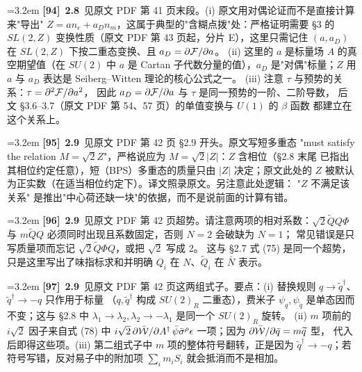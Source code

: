 \par
\par\medskip\noindent\hangindent=3.2em \textbf{[94]}~\textbf{2.8}~见原文 PDF 第 41 页末段。(i) 原文用对偶论证而不是直接计算来"导出" $Z=an_e+a_Dn_m$，这属于典型的"含糊点拨"处：严格证明需要 §3 的 $SL(2,Z)$ 变换性质（原文 PDF 第 43 页起，分片 E），这里只需记住 $(a,a_D)$ 在 $SL(2,Z)$ 下按二重态变换、且 $a_D=\partial{\cal F}/\partial a$。 (ii) 这里的 $a$ 是标量场 $A$ 的真空期望值（在 $SU(2)$ 中 $a$ 是 Cartan 子代数分量的值），$a_D$ 是"对偶"标量；$Z$ 用 $a$ 与 $a_D$ 表达是 Seiberg--Witten 理论的核心公式之一。 (iii) 注意 $\tau$ 与预势的关系：$\tau=\partial^2{\cal F}/\partial a^2$， 因此 $a_D=\partial{\cal F}/\partial a$ 与 $\tau$ 是同一预势的一阶、二阶导数， 后文 §3.6--3.7（原文 PDF 第 54、57 页）的单值变换与 $U(1)$ 的 $\beta$ 函数 都建立在这个关系上。
\par
\par\medskip\noindent\hangindent=3.2em \textbf{[95]}~\textbf{2.9}~见原文 PDF 第 42 页 §2.9 开头。原文写短多重态 "must satisfy the relation $M=\sqrt{2}Z$"，严格说应为 $M=\sqrt{2}|Z|$：$Z$ 含相位（§2.8 末尾 已指出其相位约定任意），短（BPS）多重态的质量只由 $|Z|$ 决定；原文此处的 $Z$ 被默认为正实数（在适当相位约定下）。译文照录原文。另注意此处逻辑： "$Z$ 不满足该关系" 是推出"中心荷还缺一块"的依据，而不是说前面的计算有错。
\par
\par\medskip\noindent\hangindent=3.2em \textbf{[96]}~\textbf{2.9}~见原文 PDF 第 42 页超势。请注意两项的相对系数：$\sqrt2\widetilde QQ\Phi$ 与 $m\widetilde QQ$ 必须同时出现且系数固定，否则 $N=2$ 会破缺为 $N=1$； 常见错误是只写质量项而忘记 $\sqrt2\widetilde Q\Phi Q$，或把 $\sqrt2$ 写成 2。 这与 §2.7 式 (75) 是同一个超势，只是这里写出了味指标求和并明确 $Q_i$ 在 $N$、$\widetilde Q_i$ 在 $\bar N$ 表示。
\par
\par\medskip\noindent\hangindent=3.2em \textbf{[97]}~\textbf{2.9}~见原文 PDF 第 42 页这两组式子。要点：(i) 替换规则 $q\to\widetilde q^\dagger$、$\widetilde q^\dagger\to-q$ 只作用于标量 （$q,\widetilde q^\dagger$ 构成 $SU(2)_R$ 二重态），费米子 $\psi_q,\psi_{\widetilde q}$ 是单态因而不变；这与 §2.8 中 $\lambda_1\to\lambda_2,\lambda_2\to-\lambda_1$ 是同一个 $SU(2)_R$ 旋转。 (ii) $m$ 项前的 $i\sqrt{2}$ 因子来自式 (78) 中 $i\sqrt{2}\,\partial\bar{\cal W}/\partial A^\dagger\,\bar\psi\bar\sigma^\rho\epsilon$ 一项；因为 $\partial\bar{\cal W}/\partial\bar q = m\widetilde q$ 型， 代入后即得这些项。(iii) 第二组式子中 $m$ 项的整体符号翻转，正是因为 $\widetilde q^\dagger\to-q$；若符号写错，反对易子中的附加项 $\sum_i m_i S_i$ 就会抵消而不是相加。
